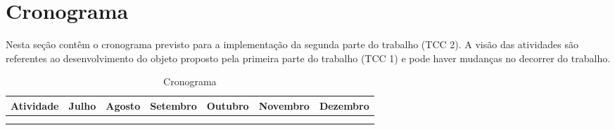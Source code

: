 \section{Cronograma}

Nesta seção contêm o cronograma previsto para a implementação da segunda
parte do trabalho (TCC 2). A visão das atividades são referentes ao
desenvolvimento do objeto proposto pela primeira parte do trabalho (TCC 1)
e pode haver mudanças no decorrer do trabalho.

\begin{table}[H]
  \centering
  \caption{Cronograma}
  \label{cron:tab}
  \begin{tabular}{|l|l|l|l|l|l|l|}
    \hline
    Atividade & Julho  & Agosto & Setembro & Outubro & Novembro & Dezembro \\ \hline
    &  &  &  &  &  &  \\ \hline
    &  &  &  &  &  &  \\ \hline
  \end{tabular}
\end{table}
